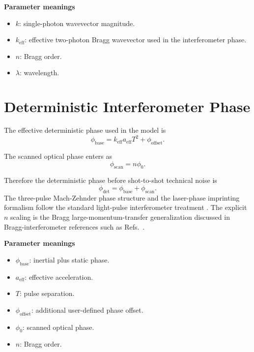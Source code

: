 \documentclass[11pt,a4paper]{article}
\begin{document}
\textbf{Parameter meanings}
\begin{itemize}[leftmargin=1.5em]
  \item $k$: single-photon wavevector magnitude.
  \item $k_{\mathrm{eff}}$: effective two-photon Bragg wavevector used in the interferometer phase.
  \item $n$: Bragg order.
  \item $\lambda$: wavelength.
\end{itemize}

\section{Deterministic Interferometer Phase}

The effective deterministic phase used in the model is
\begin{equation}
  \phi_{\mathrm{base}} = k_{\mathrm{eff}} a_{\mathrm{eff}} T^2 + \phi_{\mathrm{offset}}.
\end{equation}

The scanned optical phase enters as
\begin{equation}
  \phi_{\mathrm{scan}} = n\phi_0.
\end{equation}

Therefore the deterministic phase before shot-to-shot technical noise is
\begin{equation}
  \phi_{\mathrm{det}} = \phi_{\mathrm{base}} + \phi_{\mathrm{scan}}.
\end{equation}
The three-pulse Mach-Zehnder phase structure and the laser-phase imprinting formalism follow the standard light-pulse interferometer treatment \cite{Cheinet2008}. The explicit $n$ scaling is the Bragg large-momentum-transfer generalization discussed in Bragg-interferometer references such as Refs.~\cite{Giltner1995,Muller2008}.

\textbf{Parameter meanings}
\begin{itemize}[leftmargin=1.5em]
  \item $\phi_{\mathrm{base}}$: inertial plus static phase.
  \item $a_{\mathrm{eff}}$: effective acceleration.
  \item $T$: pulse separation.
  \item $\phi_{\mathrm{offset}}$: additional user-defined phase offset.
  \item $\phi_0$: scanned optical phase.
  \item $n$: Bragg order.
\end{itemize}
\end{document}
